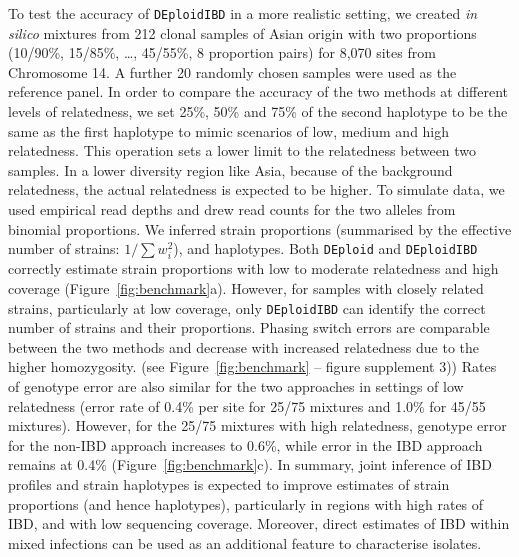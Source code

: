 \documentclass[9pt,lineno]{elife}
\begin{document}
To test the accuracy of \texttt{DEploidIBD} in a more realistic setting, we created {\it in silico} mixtures from 212 clonal samples of Asian origin with two proportions (10/90\%, 15/85\%, \dots, 45/55\%, 8 proportion pairs) for 8,070 sites from Chromosome 14.  A further 20 randomly chosen samples were used as the reference panel. In order to compare the accuracy of the two methods at different levels of relatedness, we set 25\%, 50\% and 75\% of the second haplotype to be the same as the first haplotype to mimic scenarios of low, medium and high relatedness. This operation sets a lower limit to the relatedness between two samples. In a lower diversity region like Asia, because of the background relatedness, the actual relatedness is expected to be higher.  To simulate data, we used empirical read depths and drew read counts for the two alleles from binomial proportions.  We inferred strain proportions (summarised by the effective number of strains: $1/\sum w_{i}^{2}$), and haplotypes.  Both \texttt{DEploid} and \texttt{DEploidIBD} correctly estimate strain proportions with low to moderate relatedness and high coverage (Figure~\ref{fig:benchmark}a).  However, for samples with closely related strains, particularly at low coverage, only \texttt{DEploidIBD} can identify the correct number of strains and their proportions.  Phasing switch errors are comparable between the two methods and decrease with increased relatedness due to the higher homozygosity. (see Figure~\ref{fig:benchmark} -- figure supplement 3)) Rates of genotype error are also similar for the two approaches in settings of low relatedness (error rate of 0.4\% per site for 25/75 mixtures and 1.0\% for 45/55 mixtures).  However, for the 25/75 mixtures with high relatedness, genotype error for the non-IBD approach increases to 0.6\%, while error in the IBD approach remains at 0.4\% (Figure~\ref{fig:benchmark}c).  In summary, joint inference of IBD profiles and strain haplotypes is expected to improve estimates of strain proportions (and hence haplotypes), particularly in regions with high rates of IBD, and with low sequencing coverage.  Moreover, direct estimates of IBD within mixed infections can be used as an additional feature to characterise isolates.
\end{document}
